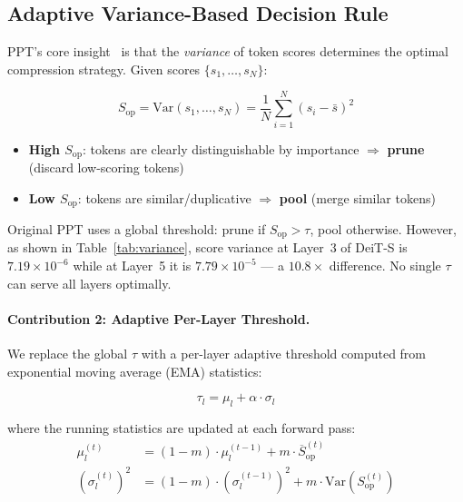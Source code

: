 \documentclass[10pt,twocolumn,letterpaper]{article}
\begin{document}
\subsection{Adaptive Variance-Based Decision Rule}
\label{sec:decision}

PPT's core insight~\cite{wu2023ppt} is that the \emph{variance} of token scores
determines the optimal compression strategy. Given scores
$\{s_1, \ldots, s_N\}$:

\begin{equation}
\label{eq:variance}
S_{\text{op}} = \text{Var}(s_1, \ldots, s_N) = \frac{1}{N}\sum_{i=1}^N (s_i - \bar{s})^2
\end{equation}

\begin{itemize}
\item \textbf{High $S_{\text{op}}$}: tokens are clearly distinguishable by
importance $\Rightarrow$ \textbf{prune} (discard low-scoring tokens)
\item \textbf{Low $S_{\text{op}}$}: tokens are similar/duplicative
$\Rightarrow$ \textbf{pool} (merge similar tokens)
\end{itemize}

Original PPT uses a global threshold: prune if $S_{\text{op}} > \tau$, pool
otherwise. However, as shown in Table~\ref{tab:variance}, score variance at
Layer~3 of DeiT-S is $7.19 \times 10^{-6}$ while at Layer~5 it is
$7.79 \times 10^{-5}$ --- a $\mathbf{10.8\times}$ difference. No single $\tau$
can serve all layers optimally.

\paragraph{Contribution 2: Adaptive Per-Layer Threshold.}
We replace the global $\tau$ with a per-layer adaptive threshold computed from
exponential moving average (EMA) statistics:

\begin{equation}
\label{eq:adaptive_tau}
\tau_l = \mu_l + \alpha \cdot \sigma_l
\end{equation}

where the running statistics are updated at each forward pass:
\begin{align}
\mu_l^{(t)} &= (1-m) \cdot \mu_l^{(t-1)} + m \cdot \overline{S}_{\text{op}}^{(t)} \\
(\sigma_l^{(t)})^2 &= (1-m) \cdot (\sigma_l^{(t-1)})^2 + m \cdot \text{Var}\!\left(S_{\text{op}}^{(t)}\right)
\end{align}
\end{document}
